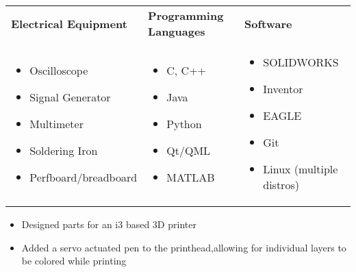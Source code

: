 \documentclass{resume}
\author{Jasper Chan}
\begin{document}
\maketitle

\TechnicalSkills
\begin{table}[H]
	\centering
	\begin{tabularx}{\textwidth}{X X X}
		\textbf{Electrical Equipment} & \textbf{Programming Languages} & \textbf{Software} \\
		\begin{itemize}
			\item Oscilloscope
			\item Signal Generator
			\item Multimeter
			\item Soldering Iron
			\item Perfboard/breadboard
		\end{itemize} & 
		\begin{itemize}
			\item C, C++
			\item Java
			\item Python
			\item Qt/QML
			\item MATLAB
		\end{itemize} &
		\begin{itemize}
			\item SOLIDWORKS
			\item Inventor
			\item EAGLE
			\item Git
			\item Linux (multiple distros)
		\end{itemize} \\
	\end{tabularx}
\end{table}

\CoopStatus


\TechnicalProjects

\begin{itemize}
	\item Designed parts for an i3 based 3D printer
	\item Added a servo actuated pen to the printhead,allowing for individual layers to be colored while printing
\end{itemize} 
\end{document}
